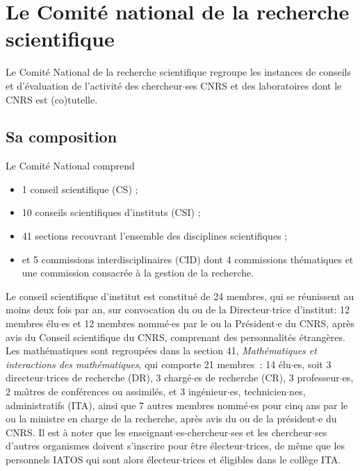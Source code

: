 

\chapter[Le Comit\'e National]{Le Comit\'e national de la recherche scientifique}
\label{CN}


Le Comit\'e National de la recherche scientifique regroupe les instances de conseils et
d'\'evaluation de l'activit\'e des chercheur$\cdot$ses CNRS et des laboratoires dont le CNRS est
(co)tutelle.

\section{Sa composition}

Le Comit\'e National comprend
\begin{itemize}
\item 1 conseil scientifique (CS) ;
\item 10 conseils scientifiques d'instituts (CSI) ;
\item 41 sections recouvrant l'ensemble des disciplines scientifiques ;
\item et 5 commissions interdisciplinaires (CID) dont 4 commissions th\'ematiques et une commission consacr\'ee \`a la gestion
de la recherche.
\end{itemize}

Le conseil scientifique d'institut est constitu\'e de 24 membres, qui se r\'eunissent au moins deux fois par an, sur convocation du ou de la Directeur$\cdot$trice d'institut:
12 membres \'elu$\cdot$es  et  12 membres nomm\'e$\cdot$es par le ou la Pr\'esident$\cdot$e du CNRS, apr\`es avis du Conseil scientifique du CNRS, comprenant des personnalit\'es \'etrang\`eres.\\

Les math\'ematiques sont regroup\'ees dans la section 41, {\it
Math\'ematiques et interactions des math\'e\-ma\-ti\-ques}, qui
comporte 21 membres~: 14 \'elu$\cdot$es, soit 3 directeur$\cdot$trices de recherche
(DR), 3 charg\'e$\cdot$es de recherche (CR), 3 professeur$\cdot$es, 2 ma\^\i tres
de conf\'erences ou assimil\'es,  et 3 ing\'enieur$\cdot$es, technicien$\cdot$nes, administratifs
(ITA), ainsi que 7 autres membres nomm\'e$\cdot$es pour cinq ans par le ou la
ministre en charge de la recherche, apr\`es avis du ou de la pr\'esident$\cdot$e du CNRS. Il est \`a noter que les enseignant$\cdot$es-chercheur$\cdot$ses et les chercheur$\cdot$ses d'autres organismes
doivent s'inscrire pour \^etre \'electeur$\cdot$trices, de m\^eme que les
personnels IATOS qui sont alors \'electeur$\cdot$trices et \'eligibles dans le
coll\`ege ITA.\\

